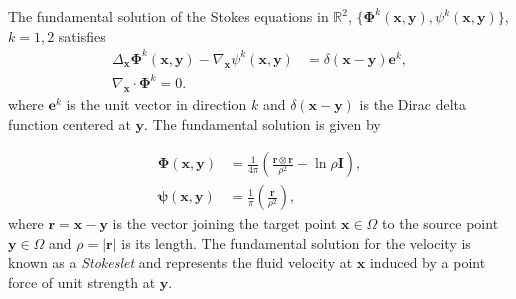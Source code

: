 The fundamental solution of the Stokes equations in $\mathbb{R}^2$, $\{\pmb{\Phi}^k(\mathbf{x},\mathbf{y}),\psi^k(\mathbf{x},\mathbf{y})\}$, $k = 1,2$ satisfies
\begin{align*}
	\Delta_{\mathbf{x}}\pmb{\Phi}^k(\mathbf{x},\mathbf{y}) - \nabla_{\mathbf{x}}\psi^k(\mathbf{x},\mathbf{y}) &= \delta(\mathbf{x}-\mathbf{y})\mathbf{e}^k,\\
	\nabla_{\mathbf{x}} \cdot\pmb{\Phi}^k = 0.
\end{align*}
where $\mathbf{e}^k$ is the unit vector in direction $k$ and $\delta(\mathbf{x}-\mathbf{y})$ is the Dirac delta function centered at $\mathbf{y}$. The fundamental solution is given by
\begin{comment}
\begin{align*}
	\pmb{\Phi}(x_1,x_2,y_1,y_2) &= \frac{1}{4\pi}\tiny\begin{pmatrix} (x_1 - y_1)(x_1 - y_1) - \ln\left(\sqrt{(x_1 - y_1)^2+(x_2-y_2)^2}\right) & (x_1 - y_1)(x_2-y_2) \\  (x_1 - y_1)(x_2-y_2) &  (x_2 - y_2)(x_2 - y_2) - \ln\left(\sqrt{(x_1 - y_1)^2+(x_2-y_2)^2}\right) \end{pmatrix}\\
	\pmb{\psi}(x_1,x_2,y_1,y_2) &=\frac{1}{\pi} \begin{pmatrix} \frac{x_1 - y_1}{\sqrt{(x_1 - y_1)^2+(x_2-y_2)^2}} \\  \frac{x_2 - y_2}{\sqrt{(x_1 - y_1)^2+(x_2-y_2)^2}}\end{pmatrix}
\end{align*}
Equivalently, in more compact notation
\end{comment}
\begin{subequations}
\begin{align}
	\pmb{\Phi}(\mathbf{x},\mathbf{y}) &= \frac{1}{4\pi}\left(\frac{\mathbf{r}\otimes\mathbf{r}}{\rho^2} - \ln\rho\mathbf{I}\right),\\
	\pmb{\psi}(\mathbf{x},\mathbf{y}) &= \frac{1}{\pi}\left(\frac{\mathbf{r}}{\rho^2}\right),
\end{align}
\end{subequations}
where $\mathbf{r} = \mathbf{x} - \mathbf{y}$ is the vector joining the target point $\mathbf{x}\in\Omega$ to the source point $\mathbf{y}\in\Omega$ and $\rho = |\mathbf{r}|$ is its length. The fundamental solution for the velocity is known as a \textit{Stokeslet} and represents the fluid velocity at $\mathbf{x}$ induced by a point force of unit strength at $\mathbf{y}$. 

